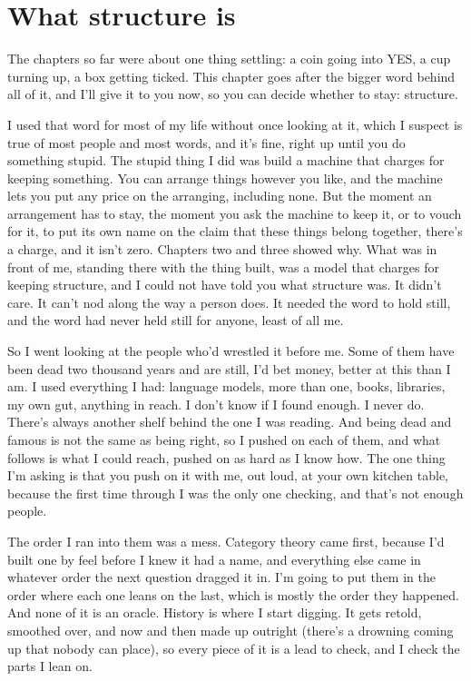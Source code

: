 \documentclass[11pt,twoside]{article}
\theoremstyle{thielethm}
\theoremstyle{thieledef}
\theoremstyle{thieledef}
\theoremstyle{thieledef}
\theoremstyle{thielethm}
\theoremstyle{thieleobs}
\theoremstyle{thielethm}
\begin{document}
\section{What structure is}
\label{sec:structure}

The chapters so far were about one thing settling: a coin going into YES, a cup turning up, a box getting ticked. This chapter goes after the bigger word behind all of it, and I'll give it to you now, so you can decide whether to stay: structure.

I used that word for most of my life without once looking at it, which I suspect is true of most people and most words, and it's fine, right up until you do something stupid. The stupid thing I did was build a machine that charges for keeping something. You can arrange things however you like, and the machine lets you put any price on the arranging, including none. But the moment an arrangement has to stay, the moment you ask the machine to keep it, or to vouch for it, to put its own name on the claim that these things belong together, there's a charge, and it isn't zero. Chapters two and three showed why. What was in front of me, standing there with the thing built, was a model that charges for keeping structure, and I could not have told you what structure was. It didn't care. It can't nod along the way a person does. It needed the word to hold still, and the word had never held still for anyone, least of all me.

So I went looking at the people who'd wrestled it before me. Some of them have been dead two thousand years and are still, I'd bet money, better at this than I am. I used everything I had: language models, more than one, books, libraries, my own gut, anything in reach. I don't know if I found enough. I never do. There's always another shelf behind the one I was reading. And being dead and famous is not the same as being right, so I pushed on each of them, and what follows is what I could reach, pushed on as hard as I know how. The one thing I'm asking is that you push on it with me, out loud, at your own kitchen table, because the first time through I was the only one checking, and that's not enough people.

The order I ran into them was a mess. Category theory came first, because I'd built one by feel before I knew it had a name, and everything else came in whatever order the next question dragged it in. I'm going to put them in the order where each one leans on the last, which is mostly the order they happened. And none of it is an oracle. History is where I start digging. It gets retold, smoothed over, and now and then made up outright (there's a drowning coming up that nobody can place), so every piece of it is a lead to check, and I check the parts I lean on.
\end{document}
